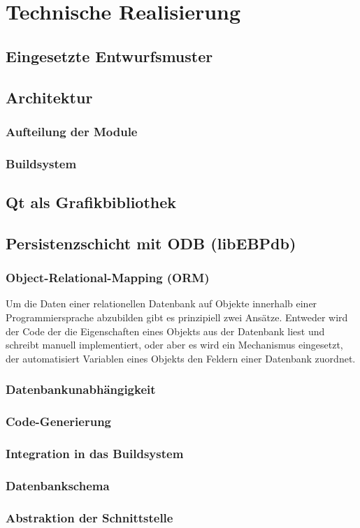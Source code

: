 \section{Technische Realisierung}

\subsection{Eingesetzte Entwurfsmuster}

\subsection{Architektur}
\subsubsection{Aufteilung der Module}
\subsubsection{Buildsystem}

\subsection{Qt als Grafikbibliothek}

\subsection{Persistenzschicht mit ODB (libEBPdb)}
\subsubsection{Object-Relational-Mapping (ORM)}
Um die Daten einer relationellen Datenbank auf Objekte innerhalb einer Programmiersprache abzubilden gibt es prinzipiell zwei Ansätze.
Entweder wird der Code der die Eigenschaften eines Objekts aus der Datenbank liest und schreibt manuell implementiert, oder aber es wird ein Mechanismus eingesetzt, der automatisiert Variablen eines Objekts den Feldern einer Datenbank zuordnet.
\subsubsection{Datenbankunabhängigkeit}
\subsubsection{Code-Generierung}
\subsubsection{Integration in das Buildsystem}
\subsubsection{Datenbankschema}
\subsubsection{Abstraktion der Schnittstelle}
